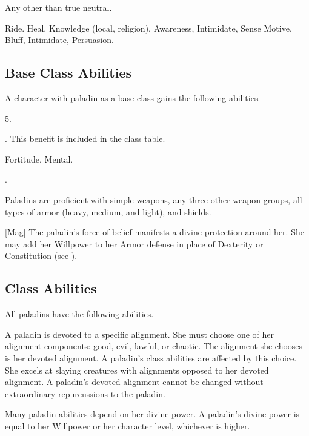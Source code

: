      Any other than true neutral.

     Ride.
     Heal, Knowledge (local, religion).
     Awareness, Intimidate, Sense Motive.
     Bluff, Intimidate, Persuasion.

    \subsection{Base Class Abilities}
        A character with paladin as a base class gains the following abilities.

         5.

         . This benefit is included in the class table.

          Fortitude,  Mental.

         .

        Paladins are proficient with simple weapons, any three other weapon groups, all types of armor (heavy, medium, and light), and shields.

        [Mag]
        The paladin's force of belief manifests a divine protection around her.
        She may add her Willpower to her Armor defense in place of Dexterity or Constitution (see ).

    \subsection{Class Abilities}
        All paladins have the following abilities.

        A paladin is devoted to a specific alignment.
        She must choose one of her alignment components: good, evil, lawful, or chaotic.
        The alignment she chooses is her devoted alignment.
        A paladin's class abilities are affected by this choice.
        She excels at slaying creatures with alignments opposed to her devoted alignment.
        A paladin's devoted alignment cannot be changed without extraordinary repurcussions to the paladin.

        Many paladin abilities depend on her divine power.
        A paladin's divine power is equal to her Willpower or her character level, whichever is higher.

